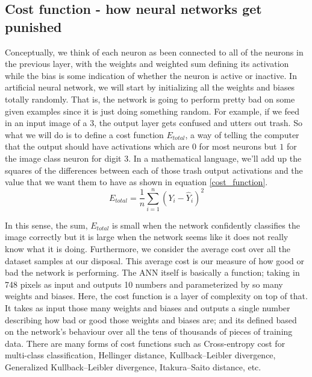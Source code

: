 \documentclass[master]{thesis-uestc}
\begin{document}
\subsection*{Cost function - how neural networks get punished}
Conceptually, we think of each neuron as been connected to all of the neurons in the previous layer, with the weights and weighted sum defining its activation while the bias is some indication of whether the neuron is active or inactive. In artificial neural network, we will start by initializing all the weights and biases totally randomly. That is, the network is going to perform pretty bad on some given examples since it is just doing something random. For example, if we feed in an input image of a $3$, the output layer gets confused and utters out trash. So what we will do is to define a cost function $E_{total}$, a way of telling the computer that the output should have activations which are $0$ for most neurons but $1$ for the image class neuron for digit 3. In a mathematical language, we'll add up the squares of the differences between each of those trash output activations and the value that we want them to have as shown in equation \ref{cost_function}.
\begin{equation}
    E_{total} = \frac{1}{n}\sum_{i=1}^{n} (Y_i - \hat{Y}_i)^2
    \label{cost_function}
\end{equation}


In this sense, the sum, $E_{total}$ is small when the network confidently classifies the image correctly but it is large when the network seems like it does not really know what it is doing. Furthermore, we consider the average cost over all the dataset samples at our disposal. This average cost is our measure of how good or bad the network is performing. The ANN itself is basically a function; taking in 748 pixels as input and outputs 10 numbers and parameterized by so many weights and biases. Here, the cost function is a layer of complexity on top of that. It takes as input those many weights and biases and outputs a single number describing how bad or good those weights and biases are; and its defined based on the network's behaviour over all the tens of thousands of pieces of training data. There are many forms of cost functions such as Cross-entropy cost\cite{deBoer2005} for multi-class classification, Hellinger distance\cite{Nikulin2018}, Kullback–Leibler divergence\cite{kullback1951}, Generalized Kullback–Leibler divergence\cite{4655451}, Itakura–Saito distance\cite{NOZAKI201763}, etc.
\end{document}
